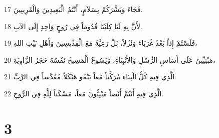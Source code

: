 \par 17 فَجَاءَ وَبَشَّرَكُمْ بِسَلاَمٍ، أَنْتُمُ الْبَعِيدِينَ وَالْقَرِيبِينَ.
\par 18 لأَنَّ بِهِ لَنَا كِلَيْنَا قُدُوماً فِي رُوحٍ وَاحِدٍ إِلَى الآبِ.
\par 19 فَلَسْتُمْ إِذاً بَعْدُ غُرَبَاءَ وَنُزُلاً، بَلْ رَعِيَّةٌ مَعَ الْقِدِّيسِينَ وَأَهْلِ بَيْتِ اللهِ،
\par 20 مَبْنِيِّينَ عَلَى أَسَاسِ الرُّسُلِ وَالأَنْبِيَاءِ، وَيَسُوعُ الْمَسِيحُ نَفْسُهُ حَجَرُ الزَّاوِيَةِ،
\par 21 الَّذِي فِيهِ كُلُّ الْبِنَاءِ مُرَكَّباً مَعاً يَنْمُو هَيْكَلاً مُقَدَّساً فِي الرَّبِّ.
\par 22 الَّذِي فِيهِ أَنْتُمْ أَيْضاً مَبْنِيُّونَ مَعاً، مَسْكَناً لِلَّهِ فِي الرُّوحِ.

\chapter{3}


